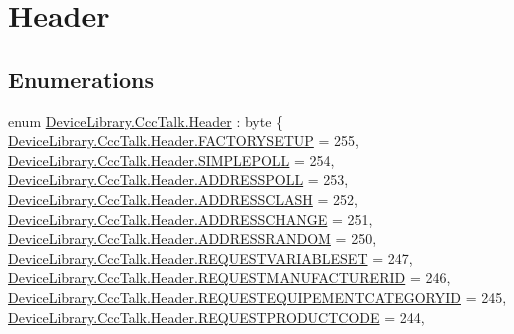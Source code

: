 \hypertarget{group___header}{}\section{Header}
\label{group___header}
\subsection*{Enumerations}
\begin{DoxyCompactItemize}
\item 
enum \mbox{\hyperlink{group___header_ga22f8eb6526627d4203e53ce7dbd3052a}{Device\+Library.\+Ccc\+Talk.\+Header}} \+: byte \{ \newline
\mbox{\hyperlink{group___header_gga22f8eb6526627d4203e53ce7dbd3052aaf6daafc242a3bea0cfdf8deaac4cbdfe}{Device\+Library.\+Ccc\+Talk.\+Header.\+F\+A\+C\+T\+O\+R\+Y\+S\+E\+T\+UP}} = 255, 
\mbox{\hyperlink{group___header_gga22f8eb6526627d4203e53ce7dbd3052aa28989b1e5d1316cb7695aa363f531a97}{Device\+Library.\+Ccc\+Talk.\+Header.\+S\+I\+M\+P\+L\+E\+P\+O\+LL}} = 254, 
\mbox{\hyperlink{group___header_gga22f8eb6526627d4203e53ce7dbd3052aa909355816ff6e7e959619e23789f2227}{Device\+Library.\+Ccc\+Talk.\+Header.\+A\+D\+D\+R\+E\+S\+S\+P\+O\+LL}} = 253, 
\mbox{\hyperlink{group___header_gga22f8eb6526627d4203e53ce7dbd3052aa44aba6ad436073d338560f89aa8f6154}{Device\+Library.\+Ccc\+Talk.\+Header.\+A\+D\+D\+R\+E\+S\+S\+C\+L\+A\+SH}} = 252, 
\newline
\mbox{\hyperlink{group___header_gga22f8eb6526627d4203e53ce7dbd3052aa2dcd6749aa763943ba4b2f6b62962505}{Device\+Library.\+Ccc\+Talk.\+Header.\+A\+D\+D\+R\+E\+S\+S\+C\+H\+A\+N\+GE}} = 251, 
\mbox{\hyperlink{group___header_gga22f8eb6526627d4203e53ce7dbd3052aa4ddfc0abc8dafde9a696ba71824c1f72}{Device\+Library.\+Ccc\+Talk.\+Header.\+A\+D\+D\+R\+E\+S\+S\+R\+A\+N\+D\+OM}} = 250, 
\mbox{\hyperlink{group___header_gga22f8eb6526627d4203e53ce7dbd3052aa0b86a65dca9c484a7bde9fca38803f0b}{Device\+Library.\+Ccc\+Talk.\+Header.\+R\+E\+Q\+U\+E\+S\+T\+V\+A\+R\+I\+A\+B\+L\+E\+S\+ET}} = 247, 
\mbox{\hyperlink{group___header_gga22f8eb6526627d4203e53ce7dbd3052aab513d3b7fc4b96e054937fb6fbbb0729}{Device\+Library.\+Ccc\+Talk.\+Header.\+R\+E\+Q\+U\+E\+S\+T\+M\+A\+N\+U\+F\+A\+C\+T\+U\+R\+E\+R\+ID}} = 246, 
\newline
\mbox{\hyperlink{group___header_gga22f8eb6526627d4203e53ce7dbd3052aae7716221fdaec83804880e8765cf7d10}{Device\+Library.\+Ccc\+Talk.\+Header.\+R\+E\+Q\+U\+E\+S\+T\+E\+Q\+U\+I\+P\+E\+M\+E\+N\+T\+C\+A\+T\+E\+G\+O\+R\+Y\+ID}} = 245, 
\mbox{\hyperlink{group___header_gga22f8eb6526627d4203e53ce7dbd3052aaaf384971e229ef28c276b9779bd81388}{Device\+Library.\+Ccc\+Talk.\+Header.\+R\+E\+Q\+U\+E\+S\+T\+P\+R\+O\+D\+U\+C\+T\+C\+O\+DE}} = 244, 

\end{DoxyCompactItemize}
